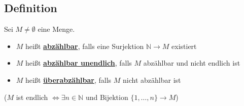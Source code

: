 \subsection{Definition} %
\label{sub:definition}
Sei $M \not= \emptyset$ eine Menge.
\begin{itemize}[--]
	\item $M$ heißt \underline{\textbf{abzählbar}}, falls eine Surjektion $\mathds{N} \to M$ existiert
	\item $M$ heißt \underline{\textbf{abzählbar unendlich}}, falls $M$ abzählbar und nicht endlich ist
	\item $M$ heißt \underline{\textbf{überabzählbar}}, falls $M$ nicht abzählbar ist
\end{itemize}
{\small ($M$ ist endlich $\Leftrightarrow \exists n \in \mathds{N}$ und Bijektion $\{1, \ldots , n\} \to M$)}

